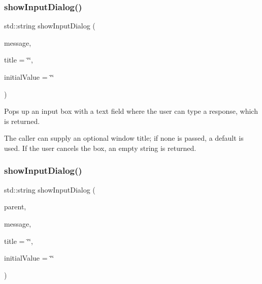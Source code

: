 \subsubsection{\texorpdfstring{show\+Input\+Dialog()}{showInputDialog()}\hspace{0.1cm}{\footnotesize\ttfamily [1/3]}}
{\footnotesize\ttfamily std\+::string show\+Input\+Dialog (\begin{DoxyParamCaption}\item[{const std\+::string \&}]{message,  }\item[{const std\+::string \&}]{title = {\ttfamily \char`\"{}\char`\"{}},  }\item[{const std\+::string \&}]{initial\+Value = {\ttfamily \char`\"{}\char`\"{}} }\end{DoxyParamCaption})\hspace{0.3cm}{\ttfamily [static]}}



Pops up an input box with a text field where the user can type a response, which is returned. 

The caller can supply an optional window title; if none is passed, a default is used. If the user cancels the box, an empty string is returned. \mbox{\label{classGOptionPane_a035a6d874c9e81773e7c61305dbecabb}} 
\subsubsection{\texorpdfstring{show\+Input\+Dialog()}{showInputDialog()}\hspace{0.1cm}{\footnotesize\ttfamily [2/3]}}
{\footnotesize\ttfamily std\+::string show\+Input\+Dialog (\begin{DoxyParamCaption}\item[{\mbox{\hyperlink{classGWindow}{G\+Window}} $\ast$}]{parent,  }\item[{const std\+::string \&}]{message,  }\item[{const std\+::string \&}]{title = {\ttfamily \char`\"{}\char`\"{}},  }\item[{const std\+::string \&}]{initial\+Value = {\ttfamily \char`\"{}\char`\"{}} }\end{DoxyParamCaption})\hspace{0.3cm}{\ttfamily [static]}}



